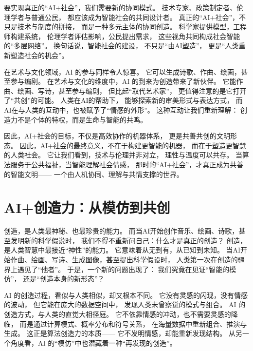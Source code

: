 要实现真正的“AI+社会”，我们需要新的协同模式。  
技术专家、政策制定者、伦理学者与普通公民，  
都应该成为智能社会的共同设计者。  
真正的“AI+社会”，不只是技术与制度的拼接，  
而是一种多元主体的协同创造。  
科学家提供模型，工程师构建系统，  
伦理学者评估影响，公民提出需求，  
这些视角共同构成社会智能的“多层网络”。  
换句话说，智能社会的建设，  
不只是“由AI塑造”，  
更是“人类重新塑造社会的机会”。

在艺术与文化领域，AI 的参与同样令人惊喜。  
它可以生成诗歌、作曲、绘画，甚至参与编剧。  
在艺术与文化的维度中，AI 的到来为创造带来了新伙伴。  
它能作曲、绘画、写诗，甚至参与编剧，  
但比起“取代艺术家”，  
更值得注意的是它打开了“共创”的可能。  
人类在AI的帮助下，  
能够探索新的审美形式与表达方式，  
而AI在与人类的互动中，也被赋予了“情感的外形”。  
这种互动让我们重新理解：  
创造力不是个体的特权，而是生命与智能的共鸣。

因此，AI+社会的目标，不仅是高效协作的机器体系，  
更是共善共创的文明形态。  
因此，AI+社会的最终意义，不在于构建更智能的机器，  
而在于塑造更智慧的人类社会。  
它让我们看到，技术与伦理并非对立，  
理性与温度可以共存。  
当算法服务于公共福祉，当智能理解社会情感，  
那时的“AI+社会”，才真正成为共善的智能文明——  
一个由人机协同、理解与共情支撑的世界。

\section{AI+创造力：从模仿到共创}

创造，是人类最神秘、也最珍贵的能力。  
而当AI开始创作音乐、绘画、诗歌，甚至发明新的科学假说时，  
我们不得不重新问自己：什么才是真正的创造？  
创造，是人类智慧中最接近“神性”的能力。  
它意味着从无到有，从已知到未知。  
当AI开始作曲、绘画、写诗、生成图像，甚至提出科学假设时，  
人类第一次在创造的疆界上遇见了“他者”。  
于是，一个新的问题出现了：  
我们究竟在见证“智能的模仿”，  
还是“创造本身的新形态”？

AI 的创造过程，看似与人类相似，却又根本不同。  
它没有灵感的闪现，没有情感的波动，  
但它能在庞大的数据空间中，  
发现人类未曾察觉的模式与组合。  
AI 的创造方式，与人类的直觉大相径庭。  
它不依靠情感的冲动，也不需要灵感的降临，  
而是通过计算模式、概率分布和符号关系，  
在海量数据中重新组合、推演与生成。  
这正是算法创造力的本质——  
它不发明情感，却能重新发现结构。  
从另一个角度看，AI 的“模仿”中也潜藏着一种“再发现的创造”。

